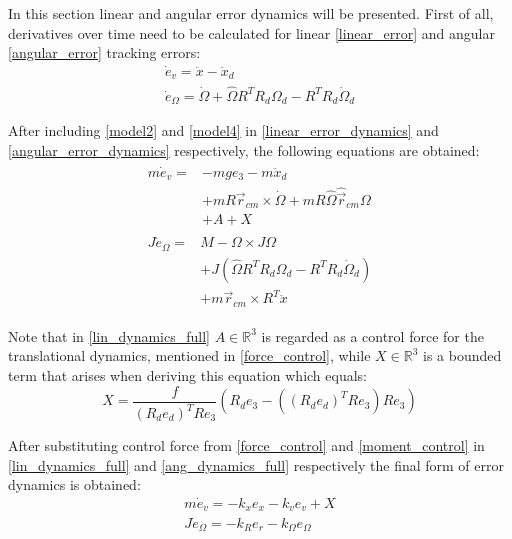 In this section linear and angular error dynamics will be presented. First of all, derivatives over time need to be calculated for linear \ref{linear_error} and angular \ref{angular_error} tracking errors:
\begin{gather}
	\dot{e}_v = \ddot{x} - \ddot{x}_d \label{linear_error_dynamics}\\
	\dot{e}_\Omega = \dot{\Omega} + \hat{\Omega}R^TR_d\Omega_d - R^TR_d\dot{\Omega}_d \label{angular_error_dynamics}
\end{gather}

\noindent After including \ref{model2} and \ref{model4} in \ref{linear_error_dynamics} and \ref{angular_error_dynamics} respectively, the following equations are obtained:
\begin{align}
	\label{lin_dynamics_full}
	\begin{split}
		m\dot{e}_v = & - mge_3 - m\ddot{x}_d \\
			&+ mR\vec{r}_{cm}  \times \dot{\Omega} + mR\hat{\Omega}\hat{\vec{r}}_{cm}\Omega \\
			&+ A + X	
	\end{split} \\
	\label{ang_dynamics_full}
	\begin{split}
		J\dot{e}_\Omega = &M - \Omega \times J\Omega \\
			&+ J(\hat{\Omega}R^TR_d\Omega_d - R^TR_d\dot{\Omega}_d) \\
			&+ m\vec{r}_{cm} \times R^T \ddot{x}
	\end{split}
\end{align}

\noindent Note that in \ref{lin_dynamics_full} $A\in \mathbb{R}^3$ is regarded as a control force for the translational dynamics, mentioned in \ref{force_control}, while $X\in\mathbb{R}^3$ is a bounded term that arises when deriving this equation which equals:
\begin{equation}
	X = \frac{f}{(R_de_d)^TRe_3}(R_d e_3 - ((R_de_d)^TRe_3)Re_3)
\end{equation}

\noindent After substituting control force from \ref{force_control} and \ref{moment_control} in \ref{lin_dynamics_full} and \ref{ang_dynamics_full} respectively the final form of error dynamics is obtained:
\begin{gather}
	m\dot{e}_v = -k_x e_x - k_v e_v + X \label{error_dynamics_linear}\\ 
	J\dot{e}_\Omega = -k_R e_r - k_\Omega e_\Omega \label{error_dynamics_angular}
\end{gather}

